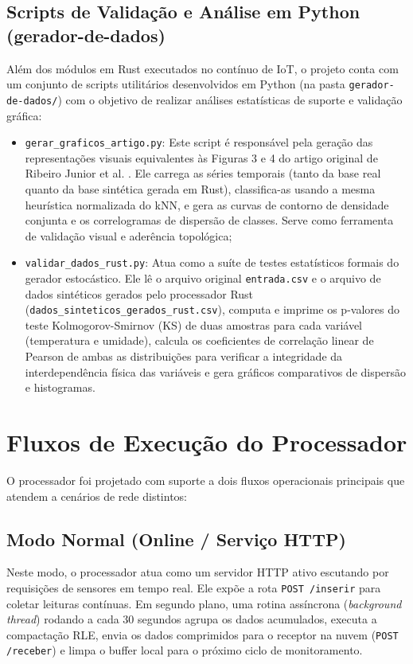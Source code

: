 \documentclass[
	12pt,
	openright,
	oneside,
	a4paper,
	english,
	brazil
	]{abntex2}
\begin{document}
\subsection{Scripts de Validação e Análise em Python (gerador-de-dados)}
Além dos módulos em Rust executados no contínuo de IoT, o projeto conta com um conjunto de scripts utilitários desenvolvidos em Python (na pasta \texttt{gerador-de-dados/}) com o objetivo de realizar análises estatísticas de suporte e validação gráfica:
\begin{itemize}
    \item \texttt{gerar\_graficos\_artigo.py}: Este script é responsável pela geração das representações visuais equivalentes às Figuras 3 e 4 do artigo original de Ribeiro Junior et al. \cite{ribeiro2020nearest}. Ele carrega as séries temporais (tanto da base real quanto da base sintética gerada em Rust), classifica-as usando a mesma heurística normalizada do kNN, e gera as curvas de contorno de densidade conjunta e os correlogramas de dispersão de classes. Serve como ferramenta de validação visual e aderência topológica;
    \item \texttt{validar\_dados\_rust.py}: Atua como a suíte de testes estatísticos formais do gerador estocástico. Ele lê o arquivo original \texttt{entrada.csv} e o arquivo de dados sintéticos gerados pelo processador Rust (\texttt{dados\_sinteticos\_gerados\_rust.csv}), computa e imprime os p-valores do teste Kolmogorov-Smirnov (KS) de duas amostras para cada variável (temperatura e umidade), calcula os coeficientes de correlação linear de Pearson de ambas as distribuições para verificar a integridade da interdependência física das variáveis e gera gráficos comparativos de dispersão e histogramas.
\end{itemize}

\section{Fluxos de Execução do Processador}

O processador foi projetado com suporte a dois fluxos operacionais principais que atendem a cenários de rede distintos:

\subsection{Modo Normal (Online / Serviço HTTP)}
Neste modo, o processador atua como um servidor HTTP ativo escutando por requisições de sensores em tempo real. Ele expõe a rota \texttt{POST /inserir} para coletar leituras contínuas. Em segundo plano, uma rotina assíncrona (\textit{background thread}) rodando a cada 30 segundos agrupa os dados acumulados, executa a compactação RLE, envia os dados comprimidos para o receptor na nuvem (\texttt{POST /receber}) e limpa o buffer local para o próximo ciclo de monitoramento.
\end{document}
